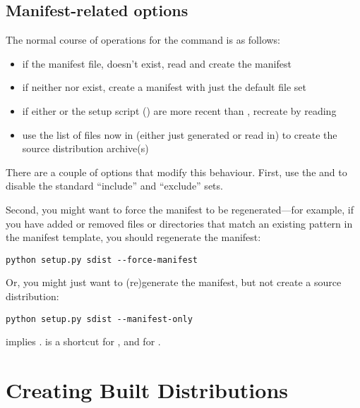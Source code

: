 \documentclass{howto}
\begin{document}
\subsection{Manifest-related options}
\label{manifest-options}

The normal course of operations for the  command is as
follows:
\begin{itemize}
\item if the manifest file,  doesn't exist, read
   and create the manifest
\item if neither  nor  exist, create a
  manifest with just the default file set
\item if either  or the setup script ()
  are more recent than , recreate  by
  reading 
\item use the list of files now in  (either just
  generated or read in) to create the source distribution archive(s)
\end{itemize}
There are a couple of options that modify this behaviour.  First, use
the  and  to
disable the standard ``include'' and ``exclude'' sets.

Second, you might want to force the manifest to be regenerated---for
example, if you have added or removed files or directories that match an
existing pattern in the manifest template, you should regenerate the
manifest:

\begin{verbatim}
python setup.py sdist --force-manifest
\end{verbatim}

Or, you might just want to (re)generate the manifest, but not create a
source distribution:

\begin{verbatim}
python setup.py sdist --manifest-only
\end{verbatim}

 implies .
 is a shortcut for , and
 for .


\section{Creating Built Distributions}
\label{built-dist}
\end{document}
